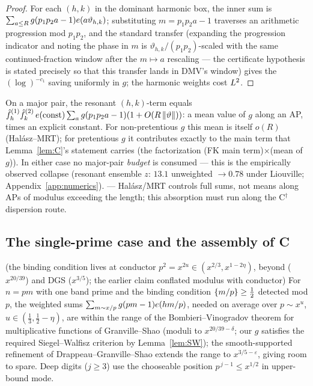 \begin{proof}
For each $(h,k)$ in the dominant harmonic box, the inner sum is
$\sum_{a\le R}g(p_1p_2a-1)e\!\left(a\vartheta_{h,k}\right)$; substituting
$m=p_1p_2a-1$ traverses an arithmetic progression mod $p_1p_2$, and
the standard transfer (expanding the progression indicator and noting
the phase in $m$ is $\vartheta_{h,k}/(p_1p_2)$-scaled with the same
continued-fraction window after the $m\mapsto a$ rescaling --- the
certificate hypothesis is stated precisely so that this transfer
lands in DMV's window) gives the $(\log)^{-c_1}$ saving uniformly in
$g$; the harmonic weights cost $L^{2}$.
\end{proof}

\begin{remark}
On a major pair, the resonant $(h,k)$-term equals
$\hat f^{(1)}_h\hat f^{(2)}_k\,e\!\left(\text{const}\right)\sum_a
g(p_1p_2a-1)(1+O(R\left\| \vartheta\right\|))$: a mean value of $g$ along an AP,
times an explicit constant. For non-pretentious $g$ this mean is
itself $o(R)$ (Hal\'asz--MRT); for pretentious $g$ it contributes
exactly to the main term that Lemma~\ref{lem:C}'s statement carries
(the factorization (FK main term)$\times$(mean of $g$)). In either
case no major-pair \emph{budget} is consumed --- this is the
empirically observed collapse (resonant ensemble $z$: $13.1$
unweighted $\to0.78$ under Liouville; Appendix~\ref{app:numerics}).
\statusO{} --- Hal\'asz/MRT controls full sums, not means along APs of
modulus exceeding the length; this absorption must run along the
C$^\dagger$ dispersion route.
\end{remark}

\subsection{The single-prime case and the assembly of C}

\begin{proposition}\label{prop:C-single}
\statusO{} (the binding condition lives at conductor
$p^{2}=x^{2u}\in(x^{2/3},x^{1-2\eta})$, beyond \cite{GS}
($x^{20/39}$) and DGS ($x^{3/5}$); the earlier claim conflated modulus
with conductor)\quad
For $n=pm$ with one band prime and the binding condition
$\left\{m/p\right\}\ge\tfrac12$ detected mod $p$, the weighted sums
$\sum_{m\sim x/p}g(pm-1)e\!\left(hm/p\right)$, needed on average over $p\sim x^u$,
$u\in(\tfrac13,\tfrac12-\eta)$, are within the range of the
Bombieri--Vinogradov theorem for multiplicative functions of
Granville--Shao \cite{GS} (moduli to $x^{20/39-\delta}$; our $g$
satisfies the required Siegel--Walfisz criterion by
Lemma~\ref{lem:SW}); the smooth-supported refinement of
Drappeau--Granville--Shao extends the range to $x^{3/5-\varepsilon}$,
giving room to spare. Deep digits ($j\ge3$) use the chooseable
position $p^{\,j-1}\le x^{1/2}$ in upper-bound mode.
\end{proposition}

